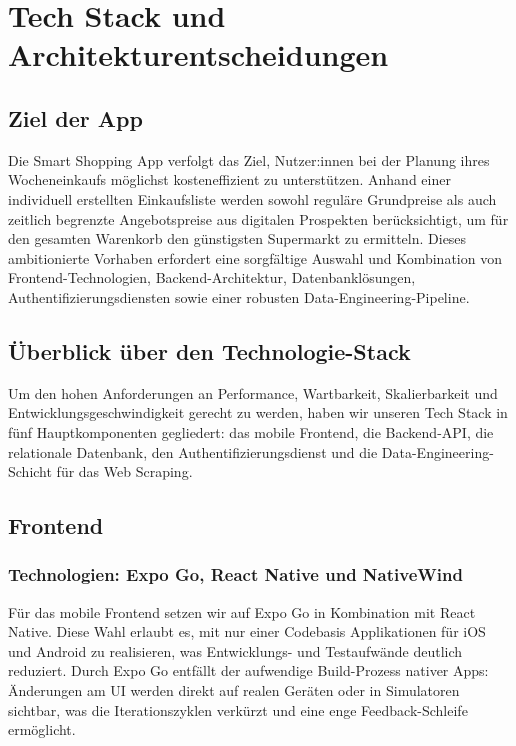 \chapter{Tech Stack und Architekturentscheidungen}
\renewcommand{\authorinitials}{DH}


\label{chap:tech_stack}

\section{Ziel der App}
Die Smart Shopping App verfolgt das Ziel, Nutzer:innen bei der Planung ihres Wocheneinkaufs möglichst kosteneffizient zu unterstützen. Anhand einer individuell erstellten Einkaufsliste werden sowohl reguläre Grundpreise als auch zeitlich begrenzte Angebots­preise aus digitalen Prospekten berücksichtigt, um für den gesamten Warenkorb den günstigsten Supermarkt zu ermitteln. Dieses ambitionierte Vorhaben erfordert eine sorgfältige Auswahl und Kombination von Frontend-Technologien, Backend-Architektur, Datenbanklösungen, Authentifizierungsdiensten sowie einer robusten Data-Engineering-Pipeline.

\section{Überblick über den Technologie-Stack}
Um den hohen Anforderungen an Performance, Wartbarkeit, Skalierbarkeit und Entwicklungsgeschwindigkeit gerecht zu werden, haben wir unseren Tech Stack in fünf Hauptkomponenten gegliedert: das mobile Frontend, die Backend-API, die relationale Datenbank, den Authentifizierungsdienst und die Data-Engineering-Schicht für das Web Scraping.

\section{Frontend}
\subsection{Technologien: Expo Go, React Native und NativeWind}
Für das mobile Frontend setzen wir auf Expo Go in Kombination mit React Native. Diese Wahl erlaubt es, mit nur einer Codebasis Applikationen für iOS und Android zu realisieren, was Entwicklungs- und Testaufwände deutlich reduziert. Durch Expo Go entfällt der aufwendige Build-Prozess nativer Apps: Änderungen am UI werden direkt auf realen Geräten oder in Simulatoren sichtbar, was die Iterationszyklen verkürzt und eine enge Feedback-Schleife ermöglicht.


